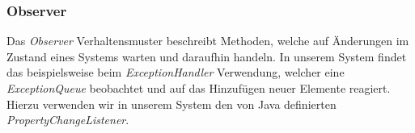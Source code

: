 \subsubsection{Observer}
Das \emph{Observer} Verhaltensmuster beschreibt Methoden, welche auf
Änderungen im Zustand eines Systems warten und daraufhin handeln.
In unserem System findet das beispielsweise beim \emph{ExceptionHandler} %
Verwendung, welcher eine \emph{ExceptionQueue} beobachtet und auf das Hinzufügen neuer Elemente
reagiert.
Hierzu verwenden wir in unserem System den von Java definierten \emph{PropertyChangeListener}.
